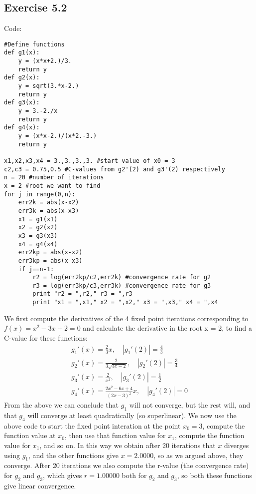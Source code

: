 \documentclass[10pt,a4paper]{article}
\begin{document}
\subsection*{Exercise 5.2}
Code:
\begin{lstlisting}
#Define functions
def g1(x):
    y = (x*x+2.)/3.
    return y
def g2(x):
    y = sqrt(3.*x-2.)
    return y
def g3(x):
    y = 3.-2./x
    return y
def g4(x):
    y = (x*x-2.)/(x*2.-3.)
    return y

x1,x2,x3,x4 = 3.,3.,3.,3. #start value of x0 = 3
c2,c3 = 0.75,0.5 #C-values from g2'(2) and g3'(2) respectively
n = 20 #number of iterations
x = 2 #root we want to find
for j in range(0,n):
    err2k = abs(x-x2)
    err3k = abs(x-x3)
    x1 = g1(x1)
    x2 = g2(x2)
    x3 = g3(x3)
    x4 = g4(x4)
    err2kp = abs(x-x2)
    err3kp = abs(x-x3)
    if j==n-1:
        r2 = log(err2kp/c2,err2k) #convergence rate for g2
        r3 = log(err3kp/c3,err3k) #convergence rate for g3	
        print "r2 = ",r2," r3 = ",r3
        print "x1 = ",x1," x2 = ",x2," x3 = ",x3," x4 = ",x4
\end{lstlisting}

\noindent We first compute the derivatives of the 4 fixed point iterations corresponding to $f(x) = x^{2} - 3x + 2 = 0$ and calculate the derivative in the root x = 2, to find a C-value for these functions:
\begin{align}
g_{1}'(x) = \frac{2}{3}x,\quad |g_{1}'(2)| = \frac{4}{3} \nonumber \\
g_{2}'(x) = \frac{2}{3\sqrt{3x-2}},\quad |g_{2}'(2)| = \frac{3}{4} \nonumber \\
g_{3}'(x) = \frac{2}{x^{2}},\quad |g_{3}'(2)| = \frac{1}{2} \nonumber \\
g_{4}'(x) = \frac{2x^{2}-6x+4}{(2x-3)^{2}}x,\quad |g_{4}'(2)| = 0 \nonumber 
\end{align}
From the above we can conclude that $g_{1}$ will not converge, but the rest will, and that $g_{4}$ will converge at least quadratically (so superlinear). We now use the above code to start the fixed point interation at the point $x_{0} = 3$, compute the function value at $x_{0}$, then use that function value for $x_{1}$, compute the function value for $x_{1}$, and so on. In this way we obtain after 20 iterations that $x$ diverges using $g_{1}$, and the other functions give $x = 2.0000$, so as we argued above, they converge. After 20 iterations we also compute the r-value (the convergence rate) for $g_{2}$ and $g_{3}$, which gives $r = 1.00000$ both for $g_{2}$ and $g_{3}$, so both these functions give linear convergence.
\end{document}
